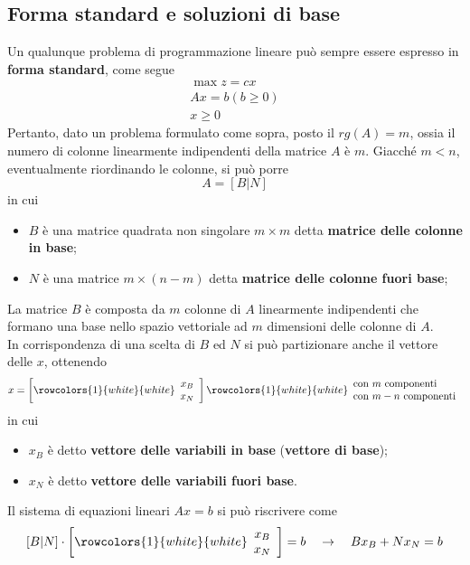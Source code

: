 \documentclass[a4paper]{extarticle}
\begin{document}
\subsection{Forma standard e soluzioni di base}
Un qualunque problema di programmazione lineare può sempre essere espresso in \textbf{forma standard}, come segue
\begin{align*}
    \max z = c x\\
    A x = b (b \geq 0)\\
    x \geq 0
\end{align*}
Pertanto, dato un problema formulato come sopra, posto il $rg(A)=m$, ossia il numero di colonne linearmente indipendenti della matrice $A$ è $m$. Giacché $m < n$, eventualmente riordinando le colonne, si può porre
\[A = \left[B \vert N\right]\]
in cui
\begin{itemize}
    \item $B$ è una matrice quadrata non singolare $m \times m$ detta \textbf{matrice delle colonne in base};
    \item $N$ è una matrice $m \times (n-m)$ detta \textbf{matrice delle colonne fuori base};
\end{itemize}
La matrice $B$ è composta da $m$ colonne di $A$ linearmente indipendenti che formano una base nello spazio vettoriale ad $m$ dimensioni delle colonne di $A$.\\
In corrispondenza di una scelta di $B$ ed $N$ si può partizionare anche il vettore delle $x$, ottenendo
\[x = \left[
    \rowcolors{1}{white}{white}
    \begin{array}{c}
        x_B\\
        x_N
    \end{array}
\right] 
\rowcolors{1}{white}{white}
\begin{array}{l}
    \text{con } m \text{ componenti}\\
    \text{con } m-n \text{ componenti}\\
\end{array}\]
in cui
\begin{itemize}
    \item $x_B$ è detto \textbf{vettore delle variabili in base} (\textbf{vettore di base});
    \item $x_N$ è detto \textbf{vettore delle variabili fuori base}.
\end{itemize}
Il sistema di equazioni lineari $Ax = b$ si può riscrivere come
\[\left[B \vert N\right] \cdot \left[
    \rowcolors{1}{white}{white}
    \begin{array}{c}
        x_B\\
        x_N
    \end{array}
\right] = b \hspace{1em} \rightarrow \hspace{1em} B x_B + N x_N = b\]
\end{document}
